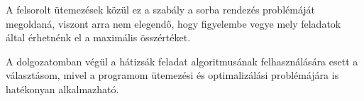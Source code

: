 A felsorolt ütemezések közül ez a szabály a sorba rendezés problémáját megoldaná, viszont arra nem elegendő, hogy figyelembe vegye mely feladatok által érhetnénk el a maximális összértéket.

A dolgozatomban végül a hátizsák feladat algoritmusának felhasználására esett a választásom, mivel a programom ütemezési és optimalizálási problémájára is hatékonyan alkalmazható.
